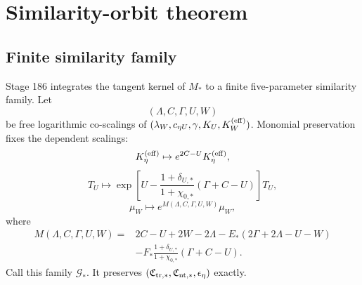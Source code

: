 
\section{Similarity-orbit theorem}
\label{sec:app-part05_weak_axisymmetric_orbit:similarity-orbit-theorem}

\subsection{Finite similarity family}
Stage 186 integrates the tangent kernel of \(M_*\) to a finite five-parameter similarity family.  Let
\begin{equation}
\label{eq:app-part05-free-log-scalings}
(\Lambda,C,\Gamma,U,W)
\end{equation}
be free logarithmic co-scalings of
\((\lambda_W,c_{\eta U},\gamma,K_U,K_W^{({\rm eff})})\).  Monomial preservation fixes the dependent scalings:
\begin{equation}
\label{eq:app-part05-Keta-orbit-law}
K_\eta^{({\rm eff})}\mapsto e^{2C-U}K_\eta^{({\rm eff})},
\end{equation}
\begin{equation}
\label{eq:app-part05-TU-orbit-law}
T_U\mapsto
\exp\!\left[
U-\frac{1+\delta_{U,*}}{1+\chi_{0,*}}(\Gamma+C-U)
\right]T_U,
\end{equation}
\begin{equation}
\label{eq:app-part05-muW-orbit-law}
\mu_W\mapsto e^{M(\Lambda,C,\Gamma,U,W)}\mu_W,
\end{equation}
where
\begin{equation}
\label{eq:app-part05-M-exponent-orbit-law}
\begin{aligned}
M(\Lambda,C,\Gamma,U,W)={}&
2C-U+2W-2\Lambda
-E_*(2\Gamma+2\Lambda-U-W)\\
&-F_*\frac{1+\delta_{U,*}}{1+\chi_{0,*}}(\Gamma+C-U).
\end{aligned}
\end{equation}
Call this family \(\mathcal G_*\).  It preserves \((\mathfrak C_{{\rm tr},*},\mathfrak C_{{\rm nt},*},\epsilon_\eta)\) exactly.

